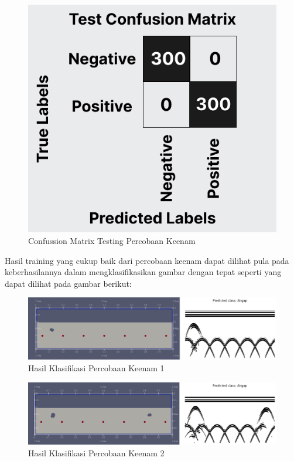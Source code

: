 \begin{figure} [H] \centering
    \includegraphics[scale=0.3]{gambar/bab4/testcon6.png}
    \caption{Confussion Matrix Testing Percobaan Keenam}
    \label{fig:testcon6}
\end{figure}

Hasil training yang cukup baik dari percobaan keenam dapat dilihat pula pada keberhasilannya dalam mengklasifikasikan gambar dengan tepat seperti yang dapat dilihat pada gambar berikut:

\begin{figure} [H] \centering
    \includegraphics[scale=0.2]{gambar/bab4/Airgap 19996.png}
    \caption{Hasil Klasifikasi Percobaan Keenam 1}
\end{figure}

\begin{figure} [H] \centering
    \includegraphics[scale=0.2]{gambar/bab4/Airgap 20006.png}
    \caption{Hasil Klasifikasi Percobaan Keenam 2}
\end{figure}

